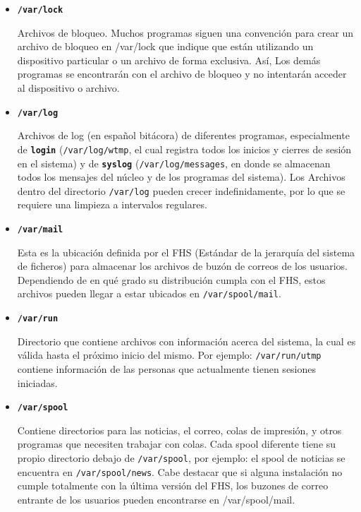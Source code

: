 \begin{itemize}
	\item 
        
	\textbf{\texttt{/var/lock}} 
        
	 Archivos de bloqueo. Muchos programas siguen una
	convención para crear un archivo de bloqueo en /var/lock que indique que
	están utilizando un dispositivo particular o un archivo de forma
	exclusiva. Así, Los demás programas se encontrarán con el archivo de
	bloqueo y no intentarán acceder al dispositivo o archivo.
	  

	\item 

	\textbf{\texttt{/var/log}} 

	  Archivos de log (en español bitácora) de diferentes
	 programas, especialmente de \texttt{\textbf{login}}
	 (\texttt{/var/log/wtmp}, el cual registra todos los inicios
	 y cierres de sesión en el sistema) y de \texttt{\textbf{syslog}}
	 (\texttt{/var/log/messages}, en donde se almacenan todos
	 los mensajes del núcleo y de los programas del sistema). Los Archivos
	 dentro del directorio \texttt{/var/log} pueden crecer
	 indefinidamente, por lo que se requiere una limpieza a intervalos
	 regulares.   

	\item 
        
	\textbf{\texttt{/var/mail}} 
        
	 Esta es la ubicación definida por el FHS (Estándar de la
	jerarquía del sistema de ficheros) para almacenar los archivos de buzón
	de correos de los usuarios. Dependiendo de en qué 		grado su
	distribución cumpla con el FHS, estos archivos pueden 	llegar a
	estar ubicados en \texttt{/var/spool/mail}.
	  

	\item 

	\textbf{\texttt{/var/run}} 
        
	 Directorio que contiene archivos con información acerca
	del sistema, la cual es válida hasta el próximo inicio del mismo. Por
	ejemplo: \texttt{/var/run/utmp} contiene información de las
	personas que actualmente tienen sesiones iniciadas.  
	 

	\item 
        
	\textbf{\texttt{/var/spool}} 
        
	 Contiene directorios para las noticias, el correo, colas
	de impresión, y otros programas que necesiten trabajar con colas.
	Cada spool diferente tiene su propio directorio debajo de
	\texttt{/var/spool}, por ejemplo: el spool de noticias se
	encuentra en \texttt{/var/spool/news}. Cabe destacar que si
	alguna instalación no cumple totalmente con la última versión del
	FHS, los buzones de correo entrante de los usuarios pueden encontrarse
	en /var/spool/mail.   


\end{itemize}
